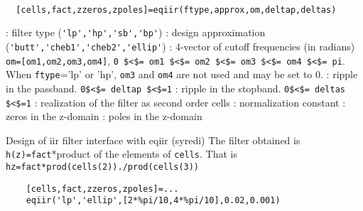 
\begin{mandesc}
   \\ %
\end{mandesc}
\begin{calling_sequence}
\begin{verbatim}
  [cells,fact,zzeros,zpoles]=eqiir(ftype,approx,om,deltap,deltas)  
\end{verbatim}
\end{calling_sequence}
\begin{parameters}
  \begin{varlist}
    : filter type (\verb!'lp','hp','sb','bp'!)
    : design approximation (\verb!'butt','cheb1','cheb2','ellip'!)
    : 4-vector of cutoff frequencies (in radians)  \verb!om=[om1,om2,om3,om4]!, \verb!0 $<$= om1 $<$= om2 $<$= om3 $<$= om4 $<$= pi!.  When \verb!ftype!='lp' or 'hp', \verb!om3! and \verb!om4! are not used  and may be set to 0.
    : ripple in the passband. \verb!0$<$= deltap $<$=1!
    : ripple in the stopband. \verb!0$<$= deltas $<$=1!
    : realization of the filter as second order cells
    : normalization constant
    : zeros in the z-domain
    : poles in the z-domain
  \end{varlist}
\end{parameters}
\begin{mandescription}
  Design of iir filter interface with eqiir (syredi)
  The filter obtained is \verb!h(z)=fact!*product of the elements of
  \verb!cells!.
  That is \verb!hz=fact*prod(cells(2))./prod(cells(3))!
\end{mandescription}
\begin{examples}
  \begin{Verbatim}
    [cells,fact,zzeros,zpoles]=...
    eqiir('lp','ellip',[2*%pi/10,4*%pi/10],0.02,0.001)
  \end{Verbatim}
\end{examples}
\begin{manseealso}
     
\end{manseealso}
